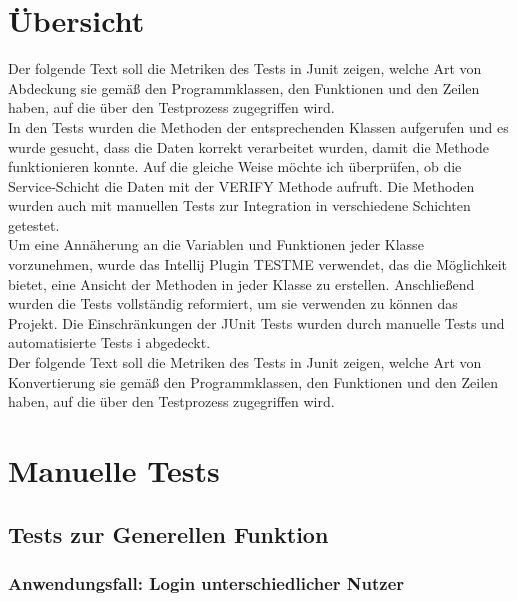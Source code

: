 \documentclass[enabledeprecatedfontcommands,fontsize=12pt,paper=a4,twoside]{scrartcl}
\begin{document}


\section{Übersicht}

Der folgende Text soll die Metriken des Tests in Junit zeigen, welche Art von Abdeckung sie gemäß den Programmklassen, den Funktionen und den Zeilen haben, auf die über den Testprozess zugegriffen wird.\\

In den Tests wurden die Methoden der entsprechenden Klassen aufgerufen und es wurde gesucht, dass die Daten korrekt verarbeitet wurden, damit die Methode funktionieren konnte. Auf die gleiche Weise möchte ich überprüfen, ob die Service-Schicht die Daten mit der VERIFY Methode aufruft. Die Methoden wurden auch mit manuellen Tests zur Integration in verschiedene Schichten getestet.\\

Um eine Annäherung an die Variablen und Funktionen jeder Klasse vorzunehmen, wurde das Intellij Plugin TESTME verwendet, das die Möglichkeit bietet, eine Ansicht der Methoden in jeder Klasse zu erstellen. Anschließend wurden die Tests vollständig reformiert, um sie verwenden zu können das Projekt. Die Einschränkungen der JUnit Tests wurden durch manuelle Tests und automatisierte Tests i abgedeckt.\\

Der folgende Text soll die Metriken des Tests in Junit zeigen, welche Art von Konvertierung sie gemäß den Programmklassen, den Funktionen und den Zeilen haben, auf die über den Testprozess zugegriffen wird.



\newpage
\section{Manuelle Tests}


\subsection{Tests zur Generellen Funktion}

\subsubsection{Anwendungsfall: Login unterschiedlicher Nutzer}
\end{document}

